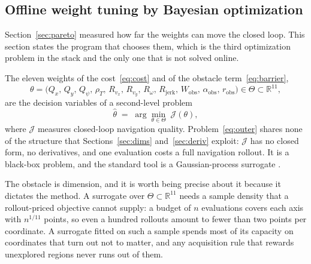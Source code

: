 \documentclass[11pt,a4paper]{article}
\newcommand{\R}{\mathbb{R}}
\newcommand{\Wobs}{W_{\mathrm{obs}}}
\newcommand{\aobs}{\alpha_{\mathrm{obs}}}
\newcommand{\robs}{r_{\mathrm{obs}}}
\newcommand{\Rjerk}{R_{\mathrm{jerk}}}
\begin{document}
\subsection{Offline weight tuning by Bayesian optimization}
\label{sec:bo}

Section~\ref{sec:pareto} measured how far the weights can move the closed loop. This section states the
program that chooses them, which is the third optimization problem in the stack and the only one that is not
solved online.

The eleven weights of the cost~\eqref{eq:cost} and of the obstacle term~\eqref{eq:barrier},
\begin{equation}
  \theta=\big(Q_x,\,Q_y,\,Q_\psi,\,\rho_T,\,R_{v_x},\,R_{v_y},\,R_\omega,\,\Rjerk,\,\Wobs,\,\aobs,\,\robs\big)
  \in\Theta\subset\R^{11},
  \label{eq:theta}
\end{equation}
are the decision variables of a second-level problem
\begin{equation}
  \hat\theta \;=\; \arg\min_{\theta\in\Theta}\;\mathcal{J}(\theta),
  \label{eq:outer}
\end{equation}
where $\mathcal{J}$ measures closed-loop navigation quality. Problem~\eqref{eq:outer} shares none of the
structure that Sections~\ref{sec:dims} and~\ref{sec:deriv} exploit: $\mathcal{J}$ has no closed form, no
derivatives, and one evaluation costs a full navigation rollout. It is a black-box problem, and the standard
tool is a Gaussian-process surrogate \cite{rasmussen2006gp,shahriari2016bo}.

The obstacle is dimension, and it is worth being precise about it because it dictates the method. A surrogate
over $\Theta\subset\R^{11}$ needs a sample density that a rollout-priced objective cannot supply: a budget of
$n$ evaluations covers each axis with $n^{1/11}$ points, so even a hundred rollouts amount to fewer than two
points per coordinate. A surrogate fitted on such a sample spends most of its capacity on coordinates that
turn out not to matter, and any acquisition rule that rewards unexplored regions never runs out of them.
\end{document}
